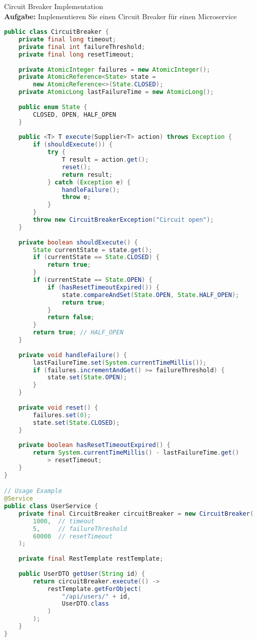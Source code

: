 \begin{example2}{Circuit Breaker Implementation}\\
\textbf{Aufgabe:} Implementieren Sie einen Circuit Breaker für einen Microservice

\begin{lstlisting}[language=Java, style=base]
public class CircuitBreaker {
    private final long timeout;
    private final int failureThreshold;
    private final long resetTimeout;
    
    private AtomicInteger failures = new AtomicInteger();
    private AtomicReference<State> state = 
        new AtomicReference<>(State.CLOSED);
    private AtomicLong lastFailureTime = new AtomicLong();
    
    public enum State {
        CLOSED, OPEN, HALF_OPEN
    }
    
    public <T> T execute(Supplier<T> action) throws Exception {
        if (shouldExecute()) {
            try {
                T result = action.get();
                reset();
                return result;
            } catch (Exception e) {
                handleFailure();
                throw e;
            }
        }
        throw new CircuitBreakerException("Circuit open");
    }
    
    private boolean shouldExecute() {
        State currentState = state.get();
        if (currentState == State.CLOSED) {
            return true;
        }
        if (currentState == State.OPEN) {
            if (hasResetTimeoutExpired()) {
                state.compareAndSet(State.OPEN, State.HALF_OPEN);
                return true;
            }
            return false;
        }
        return true; // HALF_OPEN
    }
    
    private void handleFailure() {
        lastFailureTime.set(System.currentTimeMillis());
        if (failures.incrementAndGet() >= failureThreshold) {
            state.set(State.OPEN);
        }
    }
    
    private void reset() {
        failures.set(0);
        state.set(State.CLOSED);
    }
    
    private boolean hasResetTimeoutExpired() {
        return System.currentTimeMillis() - lastFailureTime.get() 
            > resetTimeout;
    }
}

// Usage Example
@Service
public class UserService {
    private final CircuitBreaker circuitBreaker = new CircuitBreaker(
        1000,  // timeout
        5,     // failureThreshold
        60000  // resetTimeout
    );
    
    private final RestTemplate restTemplate;
    
    public UserDTO getUser(String id) {
        return circuitBreaker.execute(() ->
            restTemplate.getForObject(
                "/api/users/" + id,
                UserDTO.class
            )
        );
    }
}
\end{lstlisting}
\end{example2}

